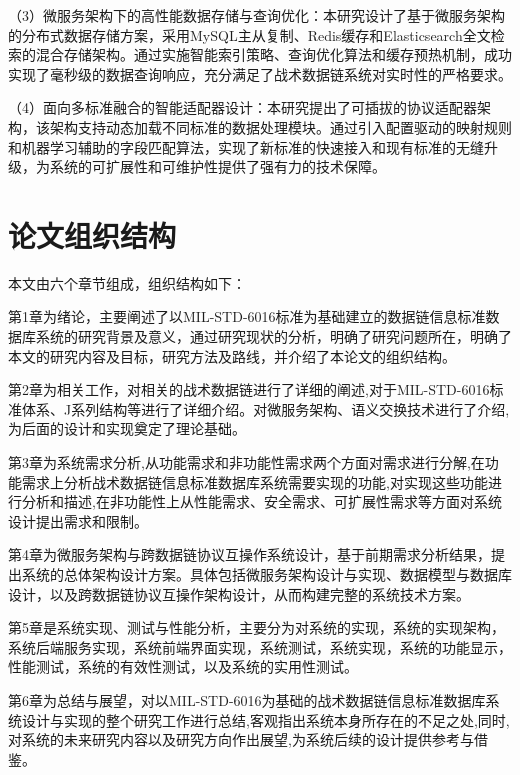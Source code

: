 （3）微服务架构下的高性能数据存储与查询优化：本研究设计了基于微服务架构的分布式数据存储方案，采用MySQL主从复制、Redis缓存和Elasticsearch全文检索的混合存储架构。通过实施智能索引策略、查询优化算法和缓存预热机制，成功实现了毫秒级的数据查询响应，充分满足了战术数据链系统对实时性的严格要求。

（4）面向多标准融合的智能适配器设计：本研究提出了可插拔的协议适配器架构，该架构支持动态加载不同标准的数据处理模块。通过引入配置驱动的映射规则和机器学习辅助的字段匹配算法，实现了新标准的快速接入和现有标准的无缝升级，为系统的可扩展性和可维护性提供了强有力的技术保障。

\section{论文组织结构}

本文由六个章节组成，组织结构如下：

第1章为绪论，主要阐述了以MIL-STD-6016标准为基础建立的数据链信息标准数据库系统的研究背景及意义，通过研究现状的分析，明确了研究问题所在，明确了本文的研究内容及目标，研究方法及路线，并介绍了本论文的组织结构。

第2章为相关工作，对相关的战术数据链进行了详细的阐述,对于MIL-STD-6016标准体系、J系列结构等进行了详细介绍。对微服务架构、语义交换技术进行了介绍,为后面的设计和实现奠定了理论基础。

第3章为系统需求分析,从功能需求和非功能性需求两个方面对需求进行分解,在功能需求上分析战术数据链信息标准数据库系统需要实现的功能,对实现这些功能进行分析和描述,在非功能性上从性能需求、安全需求、可扩展性需求等方面对系统设计提出需求和限制。

第4章为微服务架构与跨数据链协议互操作系统设计，基于前期需求分析结果，提出系统的总体架构设计方案。具体包括微服务架构设计与实现、数据模型与数据库设计，以及跨数据链协议互操作架构设计，从而构建完整的系统技术方案。

第5章是系统实现、测试与性能分析，主要分为对系统的实现，系统的实现架构，系统后端服务实现，系统前端界面实现，系统测试，系统实现，系统的功能显示，性能测试，系统的有效性测试，以及系统的实用性测试。

第6章为总结与展望，对以MIL-STD-6016为基础的战术数据链信息标准数据库系统设计与实现的整个研究工作进行总结,客观指出系统本身所存在的不足之处,同时,对系统的未来研究内容以及研究方向作出展望,为系统后续的设计提供参考与借鉴。
